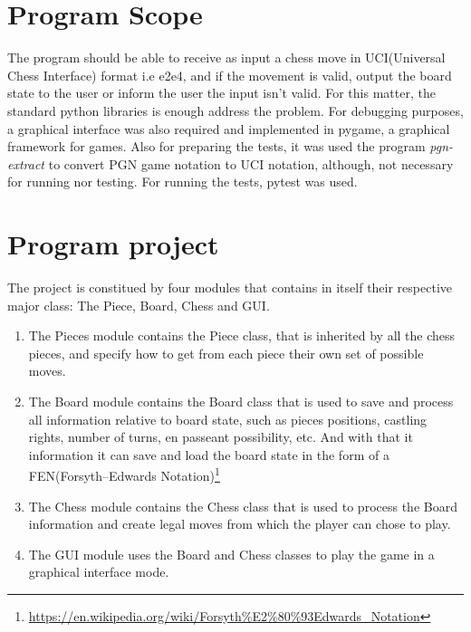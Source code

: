 \documentclass[10pt]{article}
\author{}
\title{}
\date{}
\begin{document}
\maketitle

\section{Program Scope}

The program should be able to receive as input a chess move in UCI(Universal
Chess Interface) format i.e
e2e4, and if the movement is valid, output the board state to the user or inform
the user the input isn't valid. For this matter, the standard python libraries is
enough address the problem. For debugging purposes, a graphical interface was
also required and implemented in pygame, a graphical framework for games. Also
for preparing the tests, it was used the program
\textit{pgn-extract} to convert PGN game notation to UCI notation, although, not
necessary for running nor testing. For running the tests, pytest was used.


\section{Program project}

The project is constitued by four modules that contains in itself their
respective major class: The Piece, Board, Chess and GUI.
\begin{enumerate}
    \item The Pieces module contains the Piece class, that is inherited by all
        the chess pieces, and specify how to get from each piece their own set
        of possible moves.
        \item The Board module contains the Board class that is used to save and
            process all
            information relative to board state, such as pieces positions,
            castling rights, number of turns, en passeant possibility, etc.
            And with that it information it can save and load the board state
            in the form of a FEN(Forsyth–Edwards
            Notation)\footnote{\url{https://en.wikipedia.org/wiki/Forsyth\%E2\%80\%93Edwards_Notation}}
        \item The Chess module contains the Chess class that is used to process
            the Board information and create legal moves from which the player
            can chose to play.
        \item The GUI module uses the Board and Chess classes to play the game
            in a graphical interface mode.
\end{enumerate}
\end{document}
